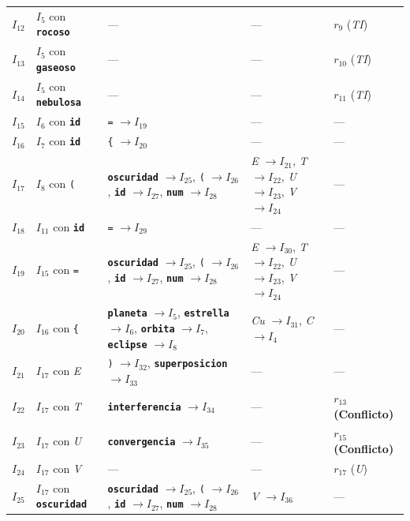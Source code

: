 \documentclass[12pt, letterpaper]{article}
\begin{document}
{\begin{longtable}{c l p{5.0cm} p{2.6cm} p{3.6cm}}
\addlinespace[2pt]
$I_{12}$ & $I_{5}$ con \textbf{\texttt{rocoso}} & --- & --- & $r_{9}$ (\textit{TI}) \\
\addlinespace[2pt]
$I_{13}$ & $I_{5}$ con \textbf{\texttt{gaseoso}} & --- & --- & $r_{10}$ (\textit{TI}) \\
\addlinespace[2pt]
$I_{14}$ & $I_{5}$ con \textbf{\texttt{nebulosa}} & --- & --- & $r_{11}$ (\textit{TI}) \\
\addlinespace[2pt]
$I_{15}$ & $I_{6}$ con \textbf{\texttt{id}} & \texttt{=} $\to I_{19}$ & --- & --- \\
\addlinespace[2pt]
$I_{16}$ & $I_{7}$ con \textbf{\texttt{id}} & \texttt{\{} $\to I_{20}$ & --- & --- \\
\addlinespace[2pt]
$I_{17}$ & $I_{8}$ con \texttt{(} & \textbf{\texttt{oscuridad}} $\to I_{25}$, \texttt{(} $\to I_{26}$, \textbf{\texttt{id}} $\to I_{27}$, \textbf{\texttt{num}} $\to I_{28}$ & \textit{E} $\to I_{21}$, \textit{T} $\to I_{22}$, \textit{U} $\to I_{23}$, \textit{V} $\to I_{24}$ & --- \\
\addlinespace[2pt]
$I_{18}$ & $I_{11}$ con \textbf{\texttt{id}} & \texttt{=} $\to I_{29}$ & --- & --- \\
\addlinespace[2pt]
$I_{19}$ & $I_{15}$ con \texttt{=} & \textbf{\texttt{oscuridad}} $\to I_{25}$, \texttt{(} $\to I_{26}$, \textbf{\texttt{id}} $\to I_{27}$, \textbf{\texttt{num}} $\to I_{28}$ & \textit{E} $\to I_{30}$, \textit{T} $\to I_{22}$, \textit{U} $\to I_{23}$, \textit{V} $\to I_{24}$ & --- \\
\addlinespace[2pt]
$I_{20}$ & $I_{16}$ con \texttt{\{} & \textbf{\texttt{planeta}} $\to I_{5}$, \textbf{\texttt{estrella}} $\to I_{6}$, \textbf{\texttt{orbita}} $\to I_{7}$, \textbf{\texttt{eclipse}} $\to I_{8}$ & \textit{Cu} $\to I_{31}$, \textit{C} $\to I_{4}$ & --- \\
\addlinespace[2pt]
$I_{21}$ & $I_{17}$ con \textit{E} & \texttt{)} $\to I_{32}$, \textbf{\texttt{superposicion}} $\to I_{33}$ & --- & --- \\
\addlinespace[2pt]
$I_{22}$ & $I_{17}$ con \textit{T} & \textbf{\texttt{interferencia}} $\to I_{34}$ & --- & \textbf{\color{accent}$r_{13}$ (Conflicto)} \\
\addlinespace[2pt]
$I_{23}$ & $I_{17}$ con \textit{U} & \textbf{\texttt{convergencia}} $\to I_{35}$ & --- & \textbf{\color{accent}$r_{15}$ (Conflicto)} \\
\addlinespace[2pt]
$I_{24}$ & $I_{17}$ con \textit{V} & --- & --- & $r_{17}$ (\textit{U}) \\
\addlinespace[2pt]
$I_{25}$ & $I_{17}$ con \textbf{\texttt{oscuridad}} & \textbf{\texttt{oscuridad}} $\to I_{25}$, \texttt{(} $\to I_{26}$, \textbf{\texttt{id}} $\to I_{27}$, \textbf{\texttt{num}} $\to I_{28}$ & \textit{V} $\to I_{36}$ & --- \\

\end{longtable}}
\end{document}
